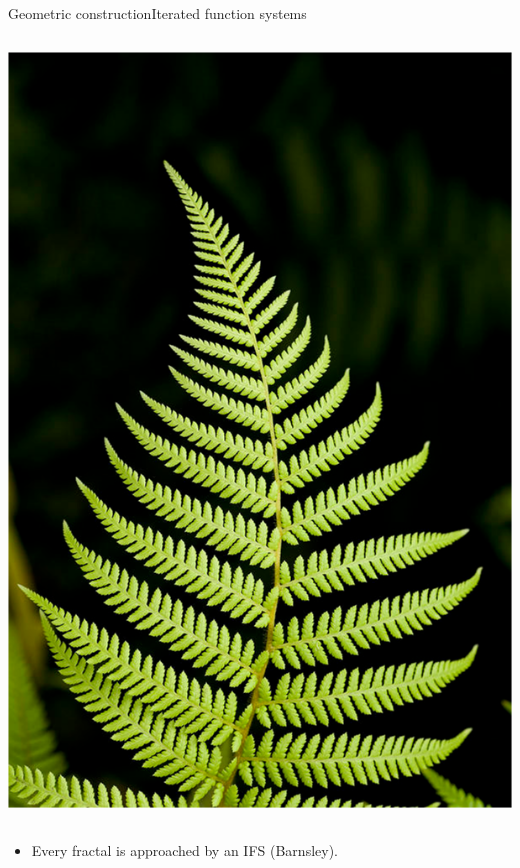 \documentclass[xcolor=x11names,compress,professionalfonts]{beamer}
\renewcommand{\(}{\begin{columns}}
\renewcommand{\)}{\end{columns}}
\newcommand{\<}[1]{\begin{column}{#1}}
\renewcommand{\>}{\end{column}}
\begin{document}
\begin{frame}{Geometric construction}{Iterated function systems}
\begin{columns}
  \begin{column}{3cm}
  \centering
     \includegraphics[scale=.4]{fern.png}
  \end{column}
\end{columns}

\begin{itemize}
	\item Every fractal is approached by an IFS (Barnsley).
\end{itemize}

\end{frame}
\end{document}
